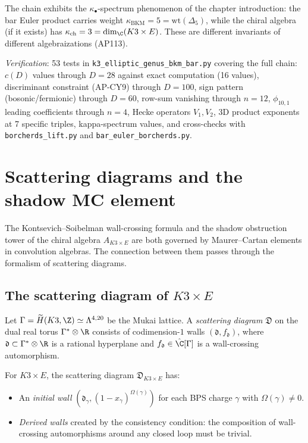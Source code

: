The chain exhibits the $\kappa_\bullet$-spectrum phenomenon
of the chapter introduction:
the bar Euler product carries weight
$\kappa_{\mathrm{BKM}} = 5 = \mathrm{wt}(\Delta_5)$,
while the chiral algebra (if it exists) has
$\kappa_{\mathrm{ch}} = 3 = \dim_\C(K3 \times E)$.
These are different invariants of different algebraizations (AP113).

\noindent\textit{Verification}: 53 tests in
\texttt{k3\_elliptic\_genus\_bkm\_bar.py} covering the full chain:
$c(D)$ values through $D = 28$ against exact computation (16 values),
discriminant constraint (AP-CY9) through $D = 100$,
sign pattern (bosonic/fermionic) through $D = 60$,
row-sum vanishing through $n = 12$,
$\phi_{10,1}$ leading coefficients through $n = 4$,
Hecke operators $V_1, V_2$,
3D product exponents at 7 specific triples,
kappa-spectrum values,
and cross-checks with \texttt{borcherds\_lift.py}
and \texttt{bar\_euler\_borcherds.py}.


\section{Scattering diagrams and the shadow MC element}
\label{sec:k3e-scattering}

The Kontsevich--Soibelman wall-crossing formula and the shadow obstruction tower of the chiral algebra $A_{K3 \times E}$ are both governed by Maurer--Cartan elements in convolution algebras. The connection between them passes through the formalism of scattering diagrams.

\subsection{The scattering diagram of $K3 \times E$}
\label{subsec:k3e-scattering-diagram}

\begin{definition}
\label{def:k3e-scattering}
Let $\Gamma = \widetilde{H}(K3, \Z) \simeq \Lambda^{4,20}$ be the Mukai lattice. A \emph{scattering diagram} $\mathfrak{D}$ on the dual real torus $\Gamma^* \otimes \R$ consists of codimension-$1$ walls $(\mathfrak{d}, f_{\mathfrak{d}})$, where $\mathfrak{d} \subset \Gamma^* \otimes \R$ is a rational hyperplane and $f_{\mathfrak{d}} \in \hat{\C}[\Gamma]$ is a wall-crossing automorphism.

For $K3 \times E$, the scattering diagram $\mathfrak{D}_{K3 \times E}$ has:
\begin{itemize}
 \item An \emph{initial wall} $(\mathfrak{d}_\gamma, (1 - x_\gamma)^{\Omega(\gamma)})$ for each BPS charge $\gamma$ with $\Omega(\gamma) \neq 0$.
 \item \emph{Derived walls} created by the consistency condition: the composition of wall-crossing automorphisms around any closed loop must be trivial.
\end{itemize}
\end{definition}

